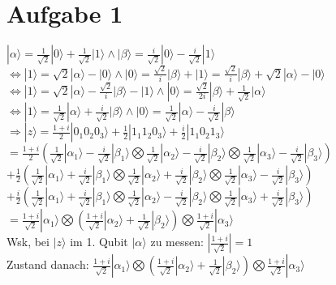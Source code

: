 \documentclass[a4paper]{scrartcl}
\begin{document}
\section*{Aufgabe 1}
$|\alpha\rangle = \frac{1}{\sqrt{2}}|0\rangle + \frac{1}{\sqrt{2}}|1\rangle \land |\beta\rangle = \frac{i}{\sqrt{2}}|0\rangle - \frac{i}{\sqrt{2}}|1\rangle$\\
$\Leftrightarrow |1\rangle = \sqrt{2} |\alpha\rangle-|0\rangle \land |0\rangle = \frac{\sqrt{2}}{i} |\beta\rangle+|1\rangle = \frac{\sqrt{2}}{i} |\beta\rangle + \sqrt{2} |\alpha\rangle-|0\rangle$\\
$\Leftrightarrow |1\rangle = \sqrt{2} |\alpha\rangle-\frac{\sqrt{2}}{i} |\beta\rangle-|1\rangle \land |0\rangle = \frac{\sqrt{2}}{2i} |\beta\rangle + \frac{1}{\sqrt{2}} |\alpha\rangle$\\
$\Leftrightarrow |1\rangle = \frac{1}{\sqrt{2}} |\alpha\rangle+\frac{i}{\sqrt{2}} |\beta\rangle \land |0\rangle =\frac{1}{\sqrt{2}} |\alpha\rangle - \frac{i}{\sqrt{2}} |\beta\rangle $\\
$\Rightarrow |z\rangle = \frac{1+i}{2} |0_1 0_2 0_3\rangle  + \frac{1}{2} |1_1 1_2 0_3\rangle + \frac{i}{2} |1_1 0_2 1_3\rangle $\\
$= \frac{1+i}{2}( \frac{1}{\sqrt{2}} |\alpha_1\rangle - \frac{i}{\sqrt{2}} |\beta_1\rangle \bigotimes \frac{1}{\sqrt{2}} |\alpha_2\rangle - \frac{i}{\sqrt{2}} |\beta_2\rangle \bigotimes \frac{1}{\sqrt{2}} |\alpha_3\rangle - \frac{i}{\sqrt{2}} |\beta_3\rangle )$\\
$+ \frac{1}{2} (\frac{1}{\sqrt{2}} |\alpha_1\rangle+\frac{i}{\sqrt{2}} |\beta_1\rangle \bigotimes \frac{1}{\sqrt{2}} |\alpha_2\rangle+\frac{i}{\sqrt{2}} |\beta_2\rangle \bigotimes \frac{1}{\sqrt{2}} |\alpha_3\rangle - \frac{i}{\sqrt{2}} |\beta_3\rangle ) $\\
$+ \frac{i}{2} (\frac{1}{\sqrt{2}} |\alpha_1\rangle+\frac{i}{\sqrt{2}} |\beta_1\rangle \bigotimes \frac{1}{\sqrt{2}} |\alpha_2\rangle - \frac{i}{\sqrt{2}} |\beta_2\rangle \bigotimes \frac{1}{\sqrt{2}} |\alpha_3\rangle+\frac{i}{\sqrt{2}} |\beta_3\rangle ) $\\
$= \frac{1+i}{\sqrt{2}} |\alpha_1\rangle \bigotimes (\frac{1+i}{\sqrt{2}} |\alpha_2\rangle + \frac{1}{\sqrt{2}} |\beta_2\rangle) \bigotimes \frac{1+i}{\sqrt{2}} |\alpha_3\rangle $\\

Wsk, bei $|z\rangle$ im 1. Qubit $|\alpha\rangle$ zu messen: $|\frac{1+i}{\sqrt{2}}| = 1$\\
Zustand danach: $\frac{1+i}{\sqrt{2}} |\alpha_1\rangle \bigotimes (\frac{1+i}{\sqrt{2}} |\alpha_2\rangle + \frac{1}{\sqrt{2}} |\beta_2\rangle) \bigotimes \frac{1+i}{\sqrt{2}} |\alpha_3\rangle $\\
\end{document}
